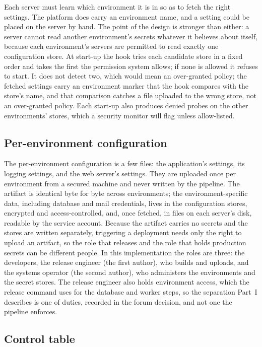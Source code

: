\documentclass[11pt]{article}
\begin{document}
Each server must learn which environment it is in so as to fetch the right settings. The platform does carry an environment name, and a setting could be placed on the server by hand. The point of the design is stronger than either: a server cannot read another environment's secrets whatever it believes about itself, because each environment's servers are permitted to read exactly one configuration store. At start-up the hook tries each candidate store in a fixed order and takes the first the permission system allows; if none is allowed it refuses to start. It does not detect two, which would mean an over-granted policy; the fetched settings carry an environment marker that the hook compares with the store's name, and that comparison catches a file uploaded to the wrong store, not an over-granted policy. Each start-up also produces denied probes on the other environments' stores, which a security monitor will flag unless allow-listed.

\subsection{Per-environment configuration}

The per-environment configuration is a few files: the application's settings, its logging settings, and the web server's settings. They are uploaded once per environment from a secured machine and never written by the pipeline. The artifact is identical byte for byte across environments; the environment-specific data, including database and mail credentials, lives in the configuration stores, encrypted and access-controlled, and, once fetched, in files on each server's disk, readable by the service account. Because the artifact carries no secrets and the stores are written separately, triggering a deployment needs only the right to upload an artifact, so the role that releases and the role that holds production secrets can be different people. In this implementation the roles are three: the developers, the release engineer (the first author), who builds and uploads, and the systems operator (the second author), who administers the environments and the secret stores. The release engineer also holds environment access, which the release command uses for the database and worker steps, so the separation Part~I describes is one of duties, recorded in the forum decision, and not one the pipeline enforces.

\subsection{Control table}
\end{document}
